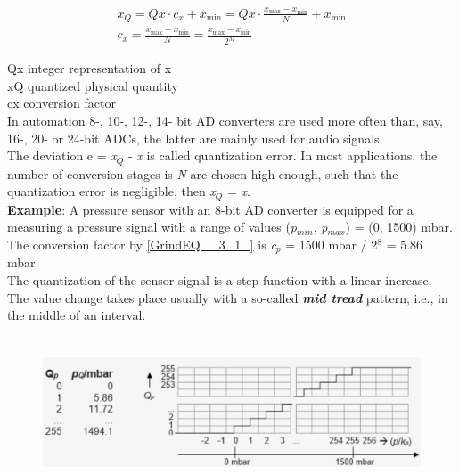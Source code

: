 \begin{equation}
	\begin{array}{l} {x_{Q} =Qx\cdot c_{x} +x_{\min } =Qx\cdot \frac{x_{\max } -x_{\min } }{N} +x_{\min } } \\ {c_{x} =\frac{x_{\max } -x_{\min } }{N} =\frac{x_{\max } -x_{\min } }{2^{M} } } \end{array}
\label{EQ }
\end{equation}

Qx	integer representation of x\\
xQ	quantized physical quantity\\
cx	conversion factor\\

In automation 8-, 10-, 12-, 14- bit AD converters are used more often than, say, 16-, 20- or 24-bit ADCs, the latter are mainly used for audio signals.\\

The deviation e = \textit{x${}_{Q}$} - \textit{x} is called quantization error. In most applications, the number of conversion stages is \textit{N} are chosen high enough, such that the quantization error is negligible, then \textit{x${}_{Q}$} = \textit{x}.\\

\textbf{Example}: A pressure sensor with an 8-bit AD converter is equipped for a measuring a pressure signal with a range of values (\textit{p${}_{min}$}, \textit{p${}_{max}$}) = (0, 1500) mbar.\\

The conversion factor by \eqref{GrindEQ__3_1_} is \textit{c${}_{p}$} = 1500 mbar / 2${}^{8}$ = 5.86 mbar.\\

The quantization of the sensor signal is a step function with a linear increase. The value change takes place usually with a so-called \textbf{\textit{mid tread}} pattern, i.e., in the middle of an interval.\\

    \begin{figure}[h]
    \centering
    \includegraphics[width=12cm, height=4.5cm]{Images/image141.png}
    \label{fig:Fig }
    \end{figure}

